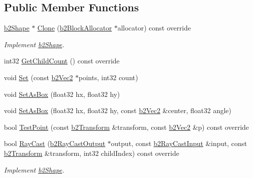 \subsection*{Public Member Functions}
\begin{DoxyCompactItemize}
\item 
\mbox{\label{classb2PolygonShape_ae2c2343be33db465f7e83db2061fdd51}} 
\mbox{\hyperlink{classb2Shape}{b2\+Shape}} $\ast$ \mbox{\hyperlink{classb2PolygonShape_ae2c2343be33db465f7e83db2061fdd51}{Clone}} (\mbox{\hyperlink{classb2BlockAllocator}{b2\+Block\+Allocator}} $\ast$allocator) const override
\begin{DoxyCompactList}\small\item\em Implement \mbox{\hyperlink{classb2Shape}{b2\+Shape}}. \end{DoxyCompactList}\item 
int32 \mbox{\hyperlink{classb2PolygonShape_aa8bb0d5a88624104425cdee0b2f4427a}{Get\+Child\+Count}} () const override
\item 
void \mbox{\hyperlink{classb2PolygonShape_a4d7b35550509f570814b97325a68966b}{Set}} (const \mbox{\hyperlink{structb2Vec2}{b2\+Vec2}} $\ast$points, int32 count)
\item 
void \mbox{\hyperlink{classb2PolygonShape_a6bb90df8b4a40d1c53b64cc352a855dd}{Set\+As\+Box}} (float32 hx, float32 hy)
\item 
void \mbox{\hyperlink{classb2PolygonShape_a890690250115483da6c7d69829be087e}{Set\+As\+Box}} (float32 hx, float32 hy, const \mbox{\hyperlink{structb2Vec2}{b2\+Vec2}} \&center, float32 angle)
\item 
bool \mbox{\hyperlink{classb2PolygonShape_a129c4ac76727fe02724f675e3fef7fe5}{Test\+Point}} (const \mbox{\hyperlink{structb2Transform}{b2\+Transform}} \&transform, const \mbox{\hyperlink{structb2Vec2}{b2\+Vec2}} \&p) const override
\item 
\mbox{\label{classb2PolygonShape_a41f20072763688f1745f12f67f40e904}} 
bool \mbox{\hyperlink{classb2PolygonShape_a41f20072763688f1745f12f67f40e904}{Ray\+Cast}} (\mbox{\hyperlink{structb2RayCastOutput}{b2\+Ray\+Cast\+Output}} $\ast$output, const \mbox{\hyperlink{structb2RayCastInput}{b2\+Ray\+Cast\+Input}} \&input, const \mbox{\hyperlink{structb2Transform}{b2\+Transform}} \&transform, int32 child\+Index) const override
\begin{DoxyCompactList}\small\item\em Implement \mbox{\hyperlink{classb2Shape}{b2\+Shape}}. \end{DoxyCompactList}\item 

\end{DoxyCompactItemize}
